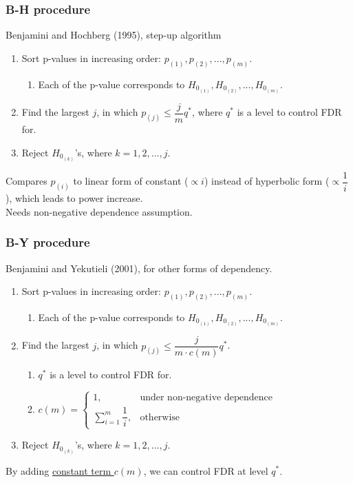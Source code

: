 \documentclass{beamer}
\begin{document}
\frame
{
    \frametitle{B-H procedure}
    Benjamini and Hochberg (1995), step-up algorithm \vspace{0.2in}\\
    \begin{enumerate}
  \item Sort p-values in increasing order: $p_{(1)}, p_{(2)}, ..., p_{(m)}$.
    \begin{enumerate}[-]
    \item Each of the p-value corresponds to $H_{0_{(1)}}, H_{0_{(2)}}, ..., H_{0_{(m)}}$. 
    \end{enumerate}
  \item Find the largest $j$, in which $p_{(j)} \leq \dfrac{j}{m}q^*$, where $q^*$ is a level to control FDR for.
  \item Reject $H_{0_{(k)}}$'s, where $k=1, 2, ..., j$.\vspace{0.22in}\\
  \end{enumerate}  
  Compares $p_{(i)}$ to linear form of constant ($\propto i$) instead of hyperbolic form ($\propto \dfrac{1}{i}$), which leads to power increase.\vspace{0.07in}\\
  Needs non-negative dependence assumption.\\
}

\frame
{
    \frametitle{B-Y procedure}
    Benjamini and Yekutieli (2001), for other forms of dependency. \vspace{0.2in}\\
    \begin{enumerate}
  \item Sort p-values in increasing order: $p_{(1)}, p_{(2)}, ..., p_{(m)}$.
    \begin{enumerate}[-]
    \item Each of the p-value corresponds to $H_{0_{(1)}}, H_{0_{(2)}}, ..., H_{0_{(m)}}$. 
    \end{enumerate}
  \item Find the largest $j$, in which $p_{(j)} \leq \dfrac{j}{m \cdot c(m)}q^*$. \\
    \begin{enumerate}[-]
      \item $q^*$ is a level to control FDR for.\\
      \item $
        c(m)=
        \begin{cases}
          1, & \text{under non-negative dependence} \\
          \sum_{i=1}^m \dfrac{1}{i}, & \text{otherwise}
        \end{cases}
      $\\
    \end{enumerate}
  \item Reject $H_{0_{(k)}}$'s, where $k=1, 2, ..., j$.\vspace{0.22in}\\
  \end{enumerate}  
  By adding \underline{constant term $c(m)$}, we can control FDR at level $q^*$. \vspace{0.1in}\\
}
\end{document}
